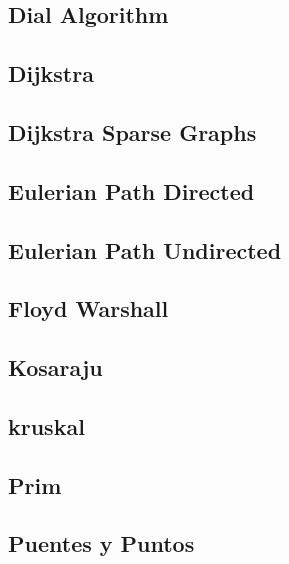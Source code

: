 \subsection{Dial Algorithm}
\raggedbottom
\hrulefill
\subsection{Dijkstra}
\raggedbottom
\hrulefill
\subsection{Dijkstra Sparse Graphs}
\raggedbottom
\hrulefill
\subsection{Eulerian Path Directed}
\raggedbottom
\hrulefill
\subsection{Eulerian Path Undirected}
\raggedbottom
\hrulefill
\subsection{Floyd Warshall}
\raggedbottom
\hrulefill
\subsection{Kosaraju}
\raggedbottom
\hrulefill
\subsection{kruskal}
\raggedbottom
\hrulefill
\subsection{Prim}
\raggedbottom
\hrulefill
\subsection{Puentes y Puntos}
\raggedbottom
\hrulefill
